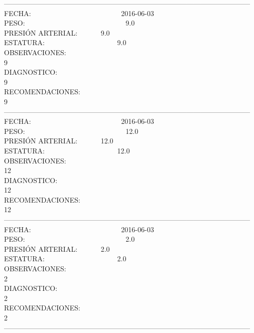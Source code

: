 \documentclass[10pt,a4paper]{letter}
\begin{document}
--------------------------------------------------------------------------------------------------------- \\
FECHA: \ \ \ \ \ \ \ \ \ \ \ \ \ \ \ \ \ \ \ \ \ \ \ \ \ 2016-06-03 \\
PESO: \ \ \ \ \ \ \ \ \ \ \ \ \ \ \ \ \ \ \ \ \ \ \ \ \ \ \ \ 9.0 \\
PRESIÓN ARTERIAL: \ \ \ \ \ \ 9.0 \\
ESTATURA: \ \ \ \ \ \ \ \ \ \ \ \ \ \ \ \ \ \ \ \ 9.0\\
OBSERVACIONES:\\
9\\
DIAGNOSTICO:\\
9\\
RECOMENDACIONES:\\
9\\
--------------------------------------------------------------------------------------------------------- \\
FECHA: \ \ \ \ \ \ \ \ \ \ \ \ \ \ \ \ \ \ \ \ \ \ \ \ \ 2016-06-03 \\
PESO: \ \ \ \ \ \ \ \ \ \ \ \ \ \ \ \ \ \ \ \ \ \ \ \ \ \ \ \ 12.0 \\
PRESIÓN ARTERIAL: \ \ \ \ \ \ 12.0 \\
ESTATURA: \ \ \ \ \ \ \ \ \ \ \ \ \ \ \ \ \ \ \ \ 12.0\\
OBSERVACIONES:\\
12\\
DIAGNOSTICO:\\
12\\
RECOMENDACIONES:\\
12\\
--------------------------------------------------------------------------------------------------------- \\
FECHA: \ \ \ \ \ \ \ \ \ \ \ \ \ \ \ \ \ \ \ \ \ \ \ \ \ 2016-06-03 \\
PESO: \ \ \ \ \ \ \ \ \ \ \ \ \ \ \ \ \ \ \ \ \ \ \ \ \ \ \ \ 2.0 \\
PRESIÓN ARTERIAL: \ \ \ \ \ \ 2.0 \\
ESTATURA: \ \ \ \ \ \ \ \ \ \ \ \ \ \ \ \ \ \ \ \ 2.0\\
OBSERVACIONES:\\
2\\
DIAGNOSTICO:\\
2\\
RECOMENDACIONES:\\
2\\
--------------------------------------------------------------------------------------------------------- \\
\end{document}

